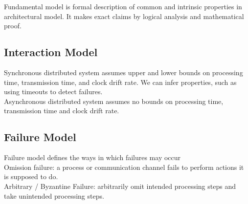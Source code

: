 \begin{multicols*}{2}
\noindent Fundamental model is formal description of common and intrinsic properties in architectural model. It makes exact claims by logical analysis and mathematical proof. 

\subsection{Interaction Model}

\noindent Synchronous distributed system assumes upper and lower bounds on processing time, transmission time, and clock drift rate. We can infer properties, such as using timeouts to detect failures.\\

\noindent Asynchronous distributed system assumes no bounds on processing time, transmission time and clock drift rate.

\subsection{Failure Model}

\noindent Failure model defines the ways in which failures may occur \\

\noindent Omission failure: a process or communication channel fails to perform actions it is supposed to do. \\

\noindent Arbitrary / Byzantine Failure: arbitrarily omit intended processing steps and take unintended processing steps.

\end{multicols*}
